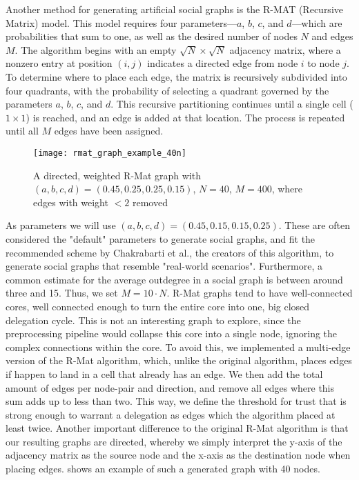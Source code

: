 Another method for generating artificial social graphs is the R-MAT (Recursive Matrix) model. \cite{chakrabartiRMATRecursiveModel2004} This model requires four parameters—$a$, $b$, $c$, and $d$—which are probabilities that sum to one, as well as the desired number of nodes $N$ and edges $M$. The algorithm begins with an empty $\sqrt{N} \times \sqrt{N}$ adjacency matrix, where a nonzero entry at position $(i, j)$ indicates a directed edge from node $i$ to node $j$. To determine where to place each edge, the matrix is recursively subdivided into four quadrants, with the probability of selecting a quadrant governed by the parameters $a$, $b$, $c$, and $d$. This recursive partitioning continues until a single cell ($1 \times 1$) is reached, and an edge is added at that location. The process is repeated until all $M$ edges have been assigned.

\begin{figure}
\centering
\texttt{[image: rmat\_graph\_example\_40n]}
\caption{A directed, weighted R-Mat graph with $(a, b, c, d) = (0.45, 0.25, 0.25, 0.15)$, $N = 40$, $M = 400$, where edges with weight $< 2$ removed}
\label{fig:rmat_example}
\end{figure}

As parameters we will use $(a, b, c, d) = (0.45, 0.15, 0.15, 0.25)$. These are often considered the "default" parameters to generate social graphs, and fit the recommended scheme by Chakrabarti et al., the creators of this algorithm, to generate social graphs that resemble "real-world scenarios". \cite{chakrabartiRMATRecursiveModel2004, zhouKanonymityLdiversityApproaches2011} Furthermore, a common estimate for the average outdegree in a social graph is between around three and 15. Thus, we set $M = 10 \cdot N$. R-Mat graphs tend to have well-connected cores, well connected enough to turn the entire core into one, big closed delegation cycle. This is not an interesting graph to explore, since the preprocessing pipeline would collapse this core into a single node, ignoring the complex connections within the core. To avoid this, we implemented a multi-edge version of the R-Mat algorithm, which, unlike the original algorithm, places edges if happen to land in a cell that already has an edge. We then add the total amount of edges per node-pair and direction, and remove all edges where this sum adds up to less than two. This way, we define the threshold for trust that is strong enough to warrant a delegation as edges which the algorithm placed at least twice. Another important difference to the original R-Mat algorithm is that our resulting graphs are directed, whereby we simply interpret the y-axis of the adjacency matrix as the source node and the x-axis as the destination node when placing edges.  shows an example of such a generated graph with 40 nodes.


